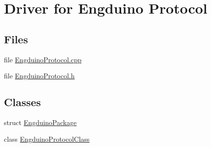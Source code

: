\hypertarget{group___engduino_protocol}{}\section{Driver for Engduino Protocol}
\label{group___engduino_protocol}
\subsection*{Files}
\begin{DoxyCompactItemize}
\item 
file \hyperlink{_engduino_protocol_8cpp}{Engduino\+Protocol.\+cpp}
\item 
file \hyperlink{_engduino_protocol_8h}{Engduino\+Protocol.\+h}
\end{DoxyCompactItemize}
\subsection*{Classes}
\begin{DoxyCompactItemize}
\item 
struct \hyperlink{struct_engduino_package}{Engduino\+Package}
\item 
class \hyperlink{class_engduino_protocol_class}{Engduino\+Protocol\+Class}
\end{DoxyCompactItemize}
